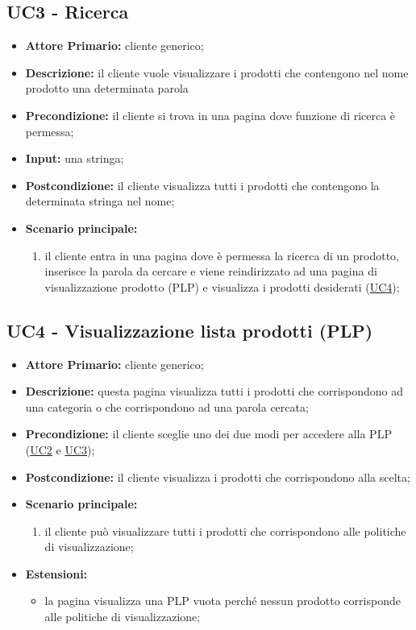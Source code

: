 \subsection{UC3 - Ricerca}
\label{UC3}
\begin{itemize}
    \item \textbf{Attore Primario:} cliente generico;
    \item \textbf{Descrizione:} il cliente vuole visualizzare i prodotti che contengono nel nome prodotto una determinata parola
    \item \textbf{Precondizione:} il cliente si trova in una pagina dove funzione di ricerca è permessa;
    \item \textbf{Input:} una stringa;
    \item \textbf{Postcondizione:} il cliente visualizza tutti i prodotti che contengono la determinata stringa nel nome;
    \item \textbf{Scenario principale:}
    \begin{enumerate}
        \item il cliente entra in una pagina dove è permessa la ricerca di un prodotto, inserisce la parola da cercare e viene reindirizzato ad una pagina di visualizzazione prodotto (PLP) e visualizza i prodotti desiderati (\hyperref[UC4]{UC4});
    \end{enumerate}
\end{itemize}

\subsection{UC4 - Visualizzazione lista prodotti (PLP)}
\label{UC4}
\begin{itemize}
    \item \textbf{Attore Primario:} cliente generico;
    \item \textbf{Descrizione:} questa pagina visualizza tutti i prodotti che corrispondono ad una categoria o che corrispondono ad una parola cercata;
    \item \textbf{Precondizione:} il cliente sceglie uno dei due modi per accedere alla PLP (\hyperref[UC2]{UC2} e \hyperref[UC3]{UC3});
    \item \textbf{Postcondizione:} il cliente visualizza i prodotti che corrispondono alla scelta;
    \item \textbf{Scenario principale:}
    \begin{enumerate}
        \item il cliente può visualizzare tutti i prodotti che corrispondono alle politiche di visualizzazione;
    \end{enumerate}
    \item \textbf{Estensioni:}
    \begin{itemize}
        \item la pagina visualizza una PLP vuota perché nessun prodotto corrisponde alle politiche di visualizzazione;
    \end{itemize}
\end{itemize}


